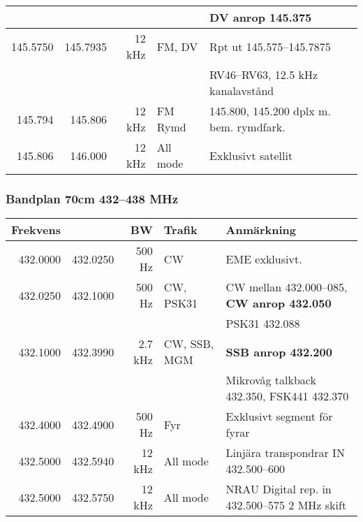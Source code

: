 \begin{landscape}
\begin{tabular}{rrrll}
         &           &         &              & DV anrop 145.375                        \\ \hline
145.5750 & 145.7935  & 12 kHz  & FM, DV       & Rpt ut 145.575--145.7875                \\
         &           &         &              & RV46–RV63, 12.5 kHz kanalavstånd        \\ \hline
145.794  & 145.806   & 12 kHz  & FM Rymd      & 145.800, 145.200 dplx m. bem. rymdfark. \\ \hline
145.806  & 146.000   & 12 kHz  & All mode     & Exklusivt satellit                      \\ \hline

\end{tabular}
\clearpage
\subsubsection{Bandplan 70cm 432--438 MHz}
\begin{tabular}{rrrll}
	\textbf{Frekvens}         &               & \textbf{BW} & \textbf{Trafik} & \textbf{Anmärkning}                                          \\ \hline
	         432.0000         & 432.0250      & 500 Hz      & CW              & EME exklusivt.                                               \\ \hline
	         432.0250         & 432.1000      & 500 Hz      & CW, PSK31       & CW mellan 432.000--085, \textbf{CW anrop 432.050}            \\
                                  &               &             &                 & PSK31 432.088                                                \\ \hline
	         432.1000         & 432.3990      & 2.7 kHz     & CW, SSB, MGM    & \textbf{SSB anrop 432.200}                                   \\
                                  &               &             &                 & Mikrovåg talkback 432.350, FSK441 432.370                    \\ \hline
	         432.4000         & 432.4900      & 500 Hz      & Fyr             & Exklusivt segment för fyrar                                  \\ \hline
	         432.5000         & 432.5940      & 12 kHz      & All mode        & Linjära transpondrar IN 432.500--600                         \\ \hline
	         432.5000         & 432.5750      & 12 kHz      & All mode        & NRAU Digital rep. in 432.500--575 2 MHz skift                \\ \hline

\end{tabular}
\end{landscape}
